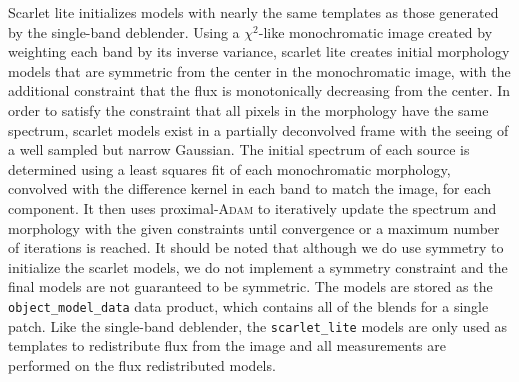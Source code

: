 Scarlet lite initializes models with nearly the same templates as those generated by the single-band deblender.
Using a $\chi^2$-like monochromatic image created by weighting each band by its inverse variance, scarlet lite creates initial morphology models that are symmetric from the center in the monochromatic image, with the additional constraint that the flux is monotonically decreasing from the center.
In order to satisfy the constraint that all pixels in the morphology have the same spectrum, scarlet models exist in a partially deconvolved frame with the seeing of a well sampled but narrow Gaussian.
The initial spectrum of each source is determined using a least squares fit of each monochromatic morphology, convolved with the difference kernel in each band to match the image, for each component.
It then uses proximal-\textsc{Adam} \citep[\textsc{PAdam};][]{2019arXiv191010094M} to iteratively update the spectrum and morphology with the given constraints until convergence or a maximum number of iterations is reached.
It should be noted that although we do use symmetry to initialize the scarlet models, we do not implement a symmetry constraint and the final models are not guaranteed to be symmetric.
The models are stored as the \texttt{object\_model\_data} data product, which contains all of the blends for a single patch.
Like the single-band deblender, the \texttt{scarlet\_lite} models are only used as templates to redistribute flux from the image and all measurements are performed on the flux redistributed models.
